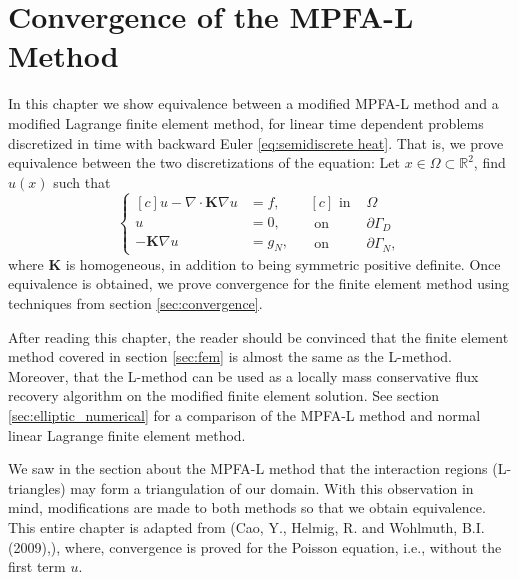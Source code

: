 \documentclass[../Main/main.tex]{subfiles}
\begin{document}
	\chapter{Convergence of the MPFA-L Method}
	\label{chap:convergence spatial mpfa}
	\graphicspath{{../Equivalence between MPFA-L and FEM/figs/}}
	In this chapter we show equivalence between a modified MPFA-L method and a modified Lagrange finite element method, for linear time dependent problems discretized in time with backward Euler  \eqref{eq:semidiscrete heat}.
	 That is, we prove equivalence between the two discretizations  of the equation: Let $x\in \Omega \subset \mathbb{R}^2$, find $u(x)$ such that
	\begin{equation}\label{eq:stationary_heat}
	\left \{
	\begin{aligned}[c]
		u - \nabla \cdot\bm{K} \nabla u &= f, \\
		u &= 0, \\
		-\pmb{K}\nabla u &= g_N,
	\end{aligned}
	\ \ \
	\begin{aligned}[c]
		\text{ in }& \Omega \\
		\text{ on }& \partial \Gamma_D \\
		\text{ on }& \partial \Gamma_N ,
	\end{aligned}
	\right.
	\end{equation}
	where $\bm{K}$ is homogeneous, in addition to being symmetric positive definite.
	Once equivalence is obtained, we prove convergence for the finite element method using techniques from section \ref{sec:convergence}. 
	\par
	After reading this chapter, the reader should be convinced that the finite element method covered in section \ref{sec:fem} is almost the same as the L-method. Moreover, that the L-method can be used as a locally mass conservative flux recovery algorithm on the modified finite element solution. See section \ref{sec:elliptic_numerical} for a comparison of the MPFA-L method and normal linear Lagrange finite element method.
	\par
	We saw in the section about the MPFA-L method that the interaction regions (L-triangles) may form a triangulation of our domain.
	With this observation in mind, modifications are made to both methods so that we obtain equivalence. This entire chapter is adapted from (Cao, Y., Helmig, R. and Wohlmuth, B.I. (2009),\cite{https://doi.org/10.1002/num.20525}), where, convergence is proved for the Poisson equation, i.e., without the first term $u$.
\end{document}
